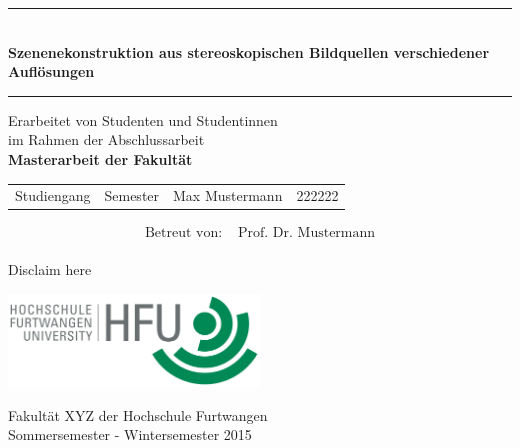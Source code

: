 \begin{titlepage}
\thispagestyle{empty}

\begin{center}
	\enlargethispage{3\baselineskip}
	\hrule
	
	\begin{center} \LARGE \textbf{\\Szenenekonstruktion aus stereoskopischen Bildquellen verschiedener Auflösungen}
	\end{center}
	
	\vspace{0.5cm}
	
	\hrule
	
	\vspace{2.5cm}
	
	{\Large Erarbeitet von Studenten und Studentinnen\\im Rahmen der Abschlussarbeit\\[2ex]
	\textbf{Masterarbeit der Fakultät}}
	
	\vspace{3cm}
	
	\begin{tabular}{l l l l}
		Studiengang &Semester &Max Mustermann &222222 \vspace{0.2cm} \\	
	\end{tabular}
	
	\vspace{1cm}
	
	\begin{align*}
	\text{Betreut von: }  &\text{Prof. Dr. Mustermann}\\
	\end{align*}	
	
	\vspace{1.0cm}
	
	Disclaim here
	
	\vspace{1.5cm}
	\includegraphics[width=0.5\textwidth]{./images/hfu_logo.png}

	Fakultät XYZ der Hochschule Furtwangen\\[1ex]
	Sommersemester - Wintersemester 2015

\end{center}

\end{titlepage}